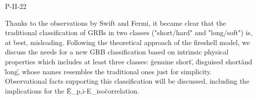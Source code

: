 P-II-22


\bigskip



\bigskip

\noindent Thanks to the observations by Swift and Fermi, it became clear that the traditional classification of GRBs in two classes ("short/hard" and "long/soft") is, at best, misleading. Following the theoretical approach of the fireshell model, we discuss the needs for a new GRB classification based on intrinsic physical properties which includes at least three classes: \"genuine short\", \"disguised short\" and \"long\", whose names resembles the traditional ones just for simplicity. Observational facts supporting this classification will be discussed, including the implications for the \"E_{p,i}-E_{iso}\" correlation.
